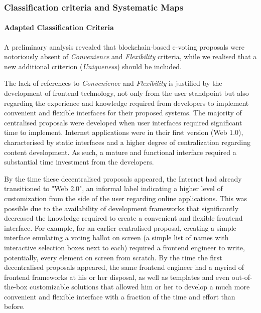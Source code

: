 \documentclass[../access.tex]{subfiles}
\begin{document}
\subsubsection{Classification criteria and Systematic Maps}

	\paragraph{Adapted Classification Criteria}
        A preliminary analysis revealed that blockchain-based e-voting proposals were notoriously absent of \textit{Convenience} and \textit{Flexibility} criteria, while we realised that a new additional criterion (\textit{Uniqueness}) should be included.
        \par
        The lack of references to \textit{Convenience} and \textit{Flexibility} is justified by the development of frontend technology, not only from the user standpoint but also regarding the experience and knowledge required from developers to implement convenient and flexible interfaces for their proposed systems. The majority of centralised proposals were developed when user interfaces required significant time to implement. Internet applications were in their first version (Web 1.0), characterised by static interfaces and a higher degree of centralization regarding content development. As such, a mature and functional interface required a substantial time investment from the developers.
        \par
        By the time these decentralised proposals appeared, the Internet had already transitioned to "Web 2.0", an informal label indicating a higher level of customization from the side of the user regarding online applications. This was possible due to the availability of development frameworks that significantly decreased the knowledge required to create a convenient and flexible frontend interface. For example, for an earlier centralised proposal, creating a simple interface emulating a voting ballot on screen (a simple list of names with interactive selection boxes next to each) required a frontend engineer to write, potentially, every element on screen from scratch. By the time the first decentralised proposals appeared, the same frontend engineer had a myriad of frontend frameworks at his or her disposal, as well as templates and even out-of-the-box customizable solutions that allowed him or her to develop a much more convenient and flexible interface with a fraction of the time and effort than before.
        \par
\end{document}
